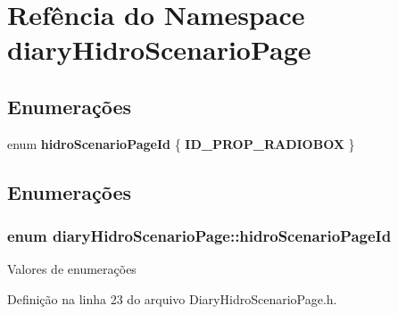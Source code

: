 \section{Refência do Namespace diary\+Hidro\+Scenario\+Page}
\label{namespacediary_hidro_scenario_page}
\subsection*{Enumerações}
\begin{DoxyCompactItemize}
\item 
enum {\bf hidro\+Scenario\+Page\+Id} \{ {\bf I\+D\+\_\+\+P\+R\+O\+P\+\_\+\+R\+A\+D\+I\+O\+B\+OX}
 \}
\end{DoxyCompactItemize}


\subsection{Enumerações}
\subsubsection[{hidro\+Scenario\+Page\+Id}]{\setlength{\rightskip}{0pt plus 5cm}enum {\bf diary\+Hidro\+Scenario\+Page\+::hidro\+Scenario\+Page\+Id}}\label{namespacediary_hidro_scenario_page_a45419eb611ed3880a3c1da00bda7d294}
\begin{Desc}
\item[Valores de enumerações]\par
\begin{description}
\item[{\em 
I\+D\+\_\+\+P\+R\+O\+P\+\_\+\+R\+A\+D\+I\+O\+B\+OX\label{namespacediary_hidro_scenario_page_a45419eb611ed3880a3c1da00bda7d294a8999d2648f88b275c5d8c00b501bc411}
}]\end{description}
\end{Desc}


Definição na linha 23 do arquivo Diary\+Hidro\+Scenario\+Page.\+h.

